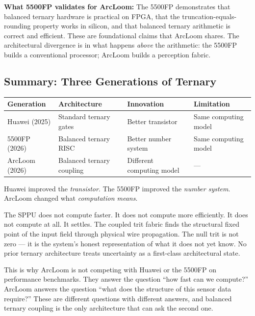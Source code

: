 \documentclass[11pt, a4paper]{article}
\begin{document}
\textbf{What 5500FP validates for ArcLoom:} The 5500FP demonstrates
that balanced ternary hardware is practical on FPGA, that the
truncation-equals-rounding property works in silicon, and that
balanced ternary arithmetic is correct and efficient. These are
foundational claims that ArcLoom shares. The architectural divergence
is in what happens \textit{above} the arithmetic: the 5500FP builds
a conventional processor; ArcLoom builds a perception fabric.

\subsection{Summary: Three Generations of Ternary}

\begin{center}
\begin{tabular}{@{}llll@{}}
\toprule
\textbf{Generation} & \textbf{Architecture} & \textbf{Innovation} & \textbf{Limitation} \\
\midrule
Huawei (2025) & Standard ternary gates & Better transistor & Same computing model \\
5500FP (2026) & Balanced ternary RISC & Better number system & Same computing model \\
ArcLoom (2026) & Balanced ternary coupling & Different computing model & --- \\
\bottomrule
\end{tabular}
\end{center}

Huawei improved the \textit{transistor}. The 5500FP improved the
\textit{number system}. ArcLoom changed what \textit{computation means}.

The SPPU does not compute faster. It does not compute more efficiently.
It does not compute at all. It settles. The coupled trit fabric finds
the structural fixed point of the input field through physical wire
propagation. The null trit is not zero --- it is the system's honest
representation of what it does not yet know. No prior ternary
architecture treats uncertainty as a first-class architectural state.

This is why ArcLoom is not competing with Huawei or the 5500FP on
performance benchmarks. They answer the question ``how fast can we
compute?'' ArcLoom answers the question ``what does the structure of
this sensor data require?'' These are different questions with
different answers, and balanced ternary coupling is the only
architecture that can ask the second one.

\end{document}
